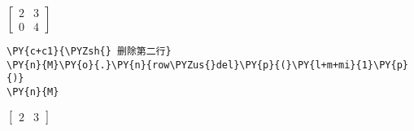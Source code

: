             
    
    $\displaystyle \left[\begin{matrix}2 & 3\\0 & 4\end{matrix}\right]$

    

    \begin{tcolorbox}[breakable, size=fbox, boxrule=1pt, pad at break*=1mm,colback=cellbackground, colframe=cellborder]
\begin{Verbatim}[commandchars=\\\{\}]
\PY{c+c1}{\PYZsh{} 删除第二行}
\PY{n}{M}\PY{o}{.}\PY{n}{row\PYZus{}del}\PY{p}{(}\PY{l+m+mi}{1}\PY{p}{)}
\PY{n}{M}
\end{Verbatim}
\end{tcolorbox}
 
            
    
    $\displaystyle \left[\begin{matrix}2 & 3\end{matrix}\right]$
